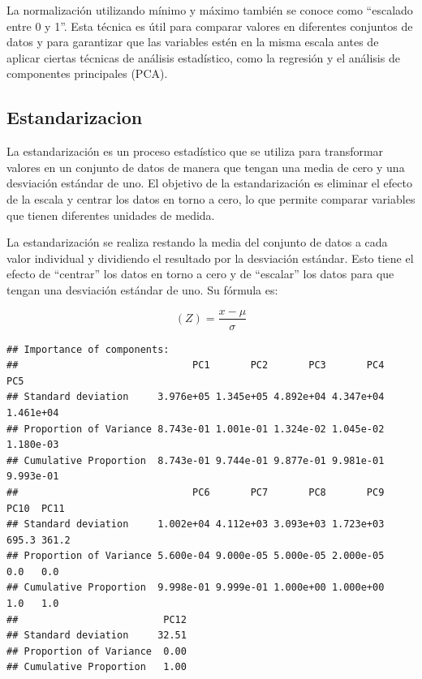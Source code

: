 \documentclass[
]{article}
\begin{document}
La normalización utilizando mínimo y máximo también se conoce como
``escalado entre 0 y 1''. Esta técnica es útil para comparar valores en
diferentes conjuntos de datos y para garantizar que las variables estén
en la misma escala antes de aplicar ciertas técnicas de análisis
estadístico, como la regresión y el análisis de componentes principales
(PCA).

\hypertarget{estandarizacion}{%
\subsection{Estandarizacion}\label{estandarizacion}}

La estandarización es un proceso estadístico que se utiliza para
transformar valores en un conjunto de datos de manera que tengan una
media de cero y una desviación estándar de uno. El objetivo de la
estandarización es eliminar el efecto de la escala y centrar los datos
en torno a cero, lo que permite comparar variables que tienen diferentes
unidades de medida.

La estandarización se realiza restando la media del conjunto de datos a
cada valor individual y dividiendo el resultado por la desviación
estándar. Esto tiene el efecto de ``centrar'' los datos en torno a cero
y de ``escalar'' los datos para que tengan una desviación estándar de
uno. Su fórmula es:

\[(Z)=\frac{x-\mu}{\sigma}\]

\begin{verbatim}
## Importance of components:
##                              PC1       PC2       PC3       PC4       PC5
## Standard deviation     3.976e+05 1.345e+05 4.892e+04 4.347e+04 1.461e+04
## Proportion of Variance 8.743e-01 1.001e-01 1.324e-02 1.045e-02 1.180e-03
## Cumulative Proportion  8.743e-01 9.744e-01 9.877e-01 9.981e-01 9.993e-01
##                              PC6       PC7       PC8       PC9  PC10  PC11
## Standard deviation     1.002e+04 4.112e+03 3.093e+03 1.723e+03 695.3 361.2
## Proportion of Variance 5.600e-04 9.000e-05 5.000e-05 2.000e-05   0.0   0.0
## Cumulative Proportion  9.998e-01 9.999e-01 1.000e+00 1.000e+00   1.0   1.0
##                         PC12
## Standard deviation     32.51
## Proportion of Variance  0.00
## Cumulative Proportion   1.00
\end{verbatim}
\end{document}
